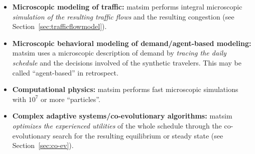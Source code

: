 \begin{itemize}\styleItemize
%
\item \textbf{Microscopic modeling of traffic:} \gls{matsim} performs integral microscopic \emph{simulation of the resulting traffic flows} and the resulting congestion (see Section~\ref{sec:trafficflowmodel}).
%
\item \textbf{Microscopic behavioral modeling of demand/agent-based modeling:}
  \gls{matsim} uses a microscopic description of demand by \emph{tracing the daily schedule} and the decisions involved of the synthetic travelers.  This may be called ``agent-based'' in retrospect.
%
\item \textbf{Computational physics:}
\gls{matsim} performs fast microscopic simulations with $10^7$ or more ``particles''.
%
\item  \textbf{Complex adaptive systems/co-evolutionary algorithms:}
\gls{matsim} \emph{optimizes the experienced utilities} of the whole schedule through the co-evolutionary search for the resulting equilibrium or steady state (see Section~\ref{sec:co-ev}). 
%

\end{itemize}





